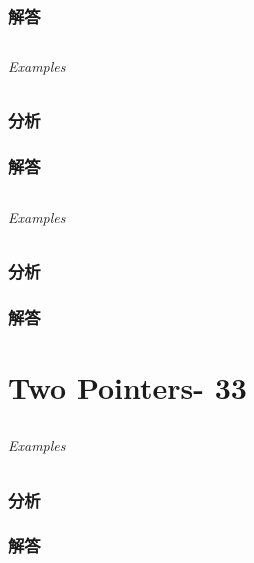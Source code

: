 \documentclass[UTF8,a4paper,12pt]{ctexbook}
\begin{document}
	\subsection{解答}
	
\section{}
	
	\subparagraph{Examples}
	
	\subsection{分析}
	
	\subsection{解答}
	
\section{}
	
	\subparagraph{Examples}
	
	\subsection{分析}
	
	\subsection{解答}
\chapter{Two Pointers- 33}
\section{}
	
	\subparagraph{Examples}
	
	\subsection{分析}
	
	\subsection{解答}
	
\section{}
	
\end{document}
